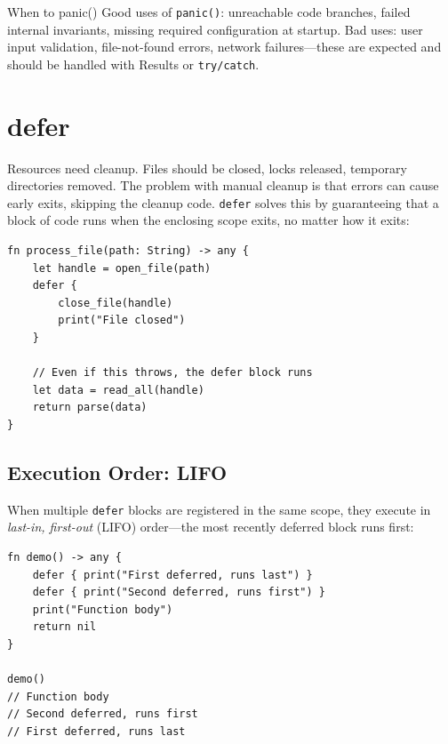 \begin{tipbox}{When to panic()}
Good uses of \lstinline|panic()|: unreachable code branches, failed internal invariants, missing required configuration at startup. Bad uses: user input validation, file-not-found errors, network failures---these are expected and should be handled with Results or \lstinline|try/catch|.
\end{tipbox}

\section{defer}\label{sec:defer}

Resources need cleanup. Files should be closed, locks released, temporary directories removed. The problem with manual cleanup is that errors can cause early exits, skipping the cleanup code. \lstinline|defer| solves this by guaranteeing that a block of code runs when the enclosing scope exits, no matter how it exits:

\begin{lstlisting}[language=Lattice, caption={defer ensures cleanup runs}]
fn process_file(path: String) -> any {
    let handle = open_file(path)
    defer {
        close_file(handle)
        print("File closed")
    }

    // Even if this throws, the defer block runs
    let data = read_all(handle)
    return parse(data)
}
\end{lstlisting}

\subsection{Execution Order: LIFO}\label{sec:defer-lifo}

When multiple \lstinline|defer| blocks are registered in the same scope, they execute in \emph{last-in, first-out} (LIFO) order---the most recently deferred block runs first:

\begin{lstlisting}[language=Lattice, caption={Defers run in reverse order}]
fn demo() -> any {
    defer { print("First deferred, runs last") }
    defer { print("Second deferred, runs first") }
    print("Function body")
    return nil
}

demo()
// Function body
// Second deferred, runs first
// First deferred, runs last
\end{lstlisting}

